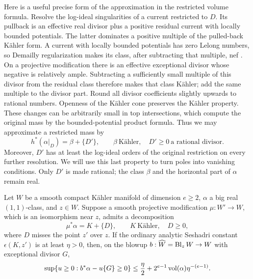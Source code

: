 Here is a useful precise form of the approximation in the restricted
volume formula.  Resolve the log-ideal singularities of a current
restricted to \(D\).  Its pullback is an effective real divisor plus a
positive residual current with locally bounded potentials.  The latter
dominates a positive multiple of the pulled-back Kähler form.  A current
with locally bounded potentials has zero Lelong numbers, so Demailly
regularization makes its class, after subtracting that multiple, nef
\cite[Theorem~1.1]{DemaillyRegularization1992}.
On a projective modification there is an effective exceptional divisor
whose negative is relatively ample.  Subtracting a sufficiently small
multiple of this divisor from the residual class therefore makes that
class Kähler; add the same multiple to the divisor part.  Round all
divisor coefficients slightly upwards to rational numbers.  Openness of
the Kähler cone preserves the Kähler property.  These changes can be
arbitrarily small in top intersections, which compute the original mass
by the bounded-potential product formula.  Thus we may approximate a
restricted mass by
\begin{equation}\label{nv:rational-fujita}
 h^*(\alpha|_D)=\beta+\{D'\},\qquad
 \beta\ \text{Kähler},\quad D'\ge0\ \text{a rational divisor}.
\end{equation}
Moreover, \(D'\) has at least the log-ideal orders of the original
restriction on every further resolution.  We will use this last
property to turn poles into vanishing conditions.  Only \(D'\) is made
rational; the class \(\beta\) and the horizontal part of \(\alpha\) remain
real.

\begin{lemma}\label{nv:pole-threshold}
Let \(W\) be a smooth compact Kähler manifold of dimension \(e\ge2\),
\(\alpha\) a big real \((1,1)\)-class, and \(z\in W\).  Suppose a smooth
projective modification \(\mu:W'\to W\), which is an isomorphism near
\(z\), admits a decomposition
\[
 \mu^*\alpha=K+\{D\},\qquad K\ \text{Kähler},\quad D\ge0,
\]
where \(D\) misses the point \(z'\) over \(z\).  If the ordinary analytic
Seshadri constant \(\epsilon(K,z')\) is at least \(\eta>0\), then, on the
blowup \(b:\widehat W=\operatorname{Bl}_zW\to W\) with exceptional divisor \(G\),
\begin{equation}\label{nv:pole-formula}
 \sup\{u\ge0:b^*\alpha-u\{G\}\ge0\}
 \le \frac{\eta}{2}
     +2^{e-1}\operatorname{vol}(\alpha)\eta^{-(e-1)} .
\end{equation}
\end{lemma}

